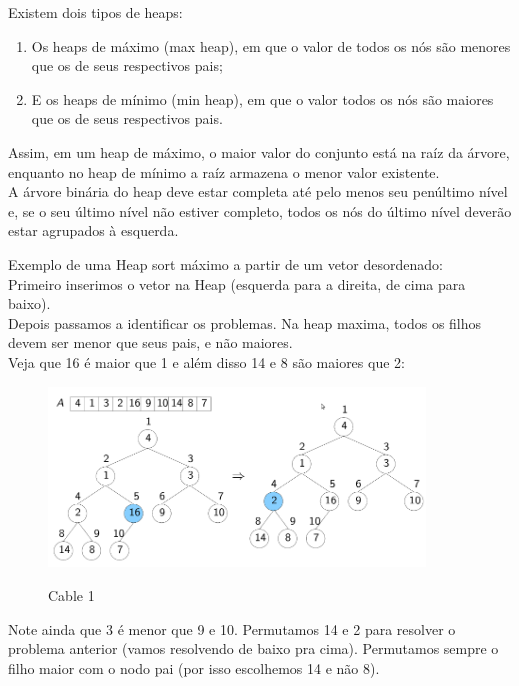 \documentclass{article}
\begin{document}
Existem dois tipos de heaps:
\begin{enumerate}
   \item Os heaps de máximo (max heap), em que o valor de todos os nós são
menores que os de seus respectivos pais;
   \item E os heaps de mínimo (min heap), em que o valor todos os nós são maiores que os de seus respectivos pais.
\end{enumerate}

Assim, em um heap de máximo, o maior valor do conjunto está na raíz da árvore, enquanto no heap de
mínimo a raíz armazena o menor valor existente.\\

A árvore binária do heap deve estar completa até pelo menos seu penúltimo nível e, se o seu último
nível não estiver completo, todos os nós do último nível deverão estar agrupados à esquerda.\\

\newpage

Exemplo de uma Heap sort máximo a partir de um vetor desordenado:\\

Primeiro inserimos o vetor na Heap (esquerda para a direita, de cima para baixo).\\
Depois passamos a identificar os problemas. Na heap maxima, todos os filhos devem ser menor que seus
pais, e não maiores.\\

Veja que 16 é maior que 1 e além disso 14 e 8 são maiores que 2:

\begin{figure}[h]
    \center
    \includegraphics[width=10cm]{imagens/heap1.png}
    \label{cable}
    \caption{Cable 1}
\end{figure}

Note ainda que 3 é menor que 9 e 10. Permutamos 14 e 2 para resolver o problema anterior (vamos
resolvendo de baixo pra cima). Permutamos sempre o filho maior com o nodo pai (por isso escolhemos
14 e não 8).
\end{document}
